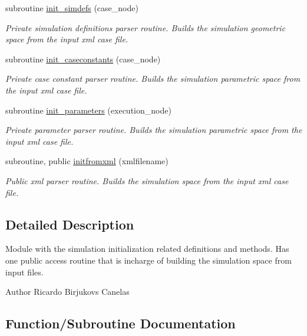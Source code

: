 \begin{DoxyCompactItemize}
subroutine \hyperlink{namespaceinitialize__mod_a18736cca205403067232125b8e510ab2}{init\+\_\+simdefs} (case\+\_\+node)
\begin{DoxyCompactList}\small\item\em Private simulation definitions parser routine. Builds the simulation geometric space from the input xml case file. \end{DoxyCompactList}\item 
subroutine \hyperlink{namespaceinitialize__mod_a9d19665b9ac12c3db8b0842bfdb6fa0c}{init\+\_\+caseconstants} (case\+\_\+node)
\begin{DoxyCompactList}\small\item\em Private case constant parser routine. Builds the simulation parametric space from the input xml case file. \end{DoxyCompactList}\item 
subroutine \hyperlink{namespaceinitialize__mod_aac9d9dabb797c83e360f9ae60a7e65e3}{init\+\_\+parameters} (execution\+\_\+node)
\begin{DoxyCompactList}\small\item\em Private parameter parser routine. Builds the simulation parametric space from the input xml case file. \end{DoxyCompactList}\item 
subroutine, public \hyperlink{namespaceinitialize__mod_a107012ffec69fe2d7c524d240193439e}{initfromxml} (xmlfilename)
\begin{DoxyCompactList}\small\item\em Public xml parser routine. Builds the simulation space from the input xml case file. \end{DoxyCompactList}\end{DoxyCompactItemize}


\subsection{Detailed Description}
Module with the simulation initialization related definitions and methods. Has one public access routine that is incharge of building the simulation space from input files. 

\begin{DoxyAuthor}{Author}
Ricardo Birjukovs Canelas 
\end{DoxyAuthor}


\subsection{Function/\+Subroutine Documentation}
\mbox{\label{namespaceinitialize__mod_a9d19665b9ac12c3db8b0842bfdb6fa0c}} 
